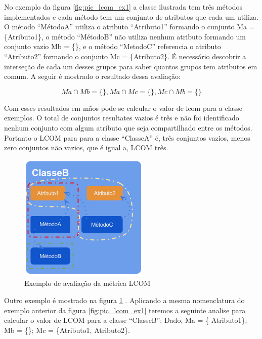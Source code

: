 \documentclass[conference]{IEEEtran}
\begin{document}
\begin{description}
\begin{figure}[htb]
\end{figure}

No exemplo da figura \ref{fig:pic_lcom_ex1} a classe ilustrada tem três métodos
implementados e cada método tem um conjunto de atributos que cada um utiliza.
O método ``MétodoA'' utiliza o atributo ``Atributo1'' formando o cunjunto Ma =
\{Atributo1\}, o método ``MétodoB'' não utiliza nenhum atributo formando um
conjunto vazio Mb = \{\}, e o método ``MetodoC'' referencia o atributo
``Atributo2'' formando o conjunto Mc = \{Atributo2\}. É necessário descobrir a
interseção de cada um desses grupos para saber quantos grupos tem atributos em
comum. A seguir é mostrado o resultado dessa avaliação:

\[
Ma \cap Mb = \{ \},
Ma \cap Mc = \{ \},
Mc \cap Mb = \{ \}
\]

Com esses resultados em mãos pode-se calcular o valor de lcom para a classe
exemplos. O total de conjuntos resultates vazios é três  e não foi identificado
nenhum conjunto com algum atributo que seja compartilhado entre os métodos.
Portanto o LCOM para para a classe ``ClasseA'' é, três conjuntos vazios, menos
zero conjuntos não vazios, que é igual a, LCOM três.

\begin{figure}[htb]
	\begin{center}
		\includegraphics[scale=0.8]{img/pic_lcom_ex2.png}
	\end{center}
	\caption{\label{fig:pic_lcom_ex2}Exemplo  de avaliação da métrica LCOM}
	
\end{figure}

Outro exemplo é mostrado na figura \ref{fig:pic_lcom_ex2} . Aplicando a mesma
nomenclatura do exemplo anterior da figura \ref{fig:pic_lcom_ex1} teremos a
seguinte analise para calcular o valor de LCOM para a classe ``ClasseB'': Dado,
Ma = \{ Atributo1\}; Mb = \{\}; Mc = \{Atributo1, Atributo2\}. 


\end{description}
\end{document}
